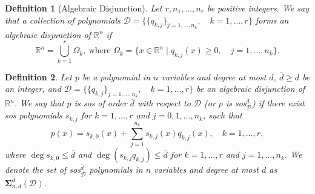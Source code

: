 \documentclass[12pt]{article}
\newcommand{\reals}{\mathbb{R}}
\newcommand{\DiSOS}{\mathbf{\Sigma}}
\newcommand{\mcD}{\mathcal{D}}
\newtheorem{definition}{Definition}%
\theoremstyle{remark}
\newtheorem{remark}{Remark}%
\begin{document}
\begin{definition}[Algebraic Disjunction]\label{def:disjunction}
Let $r,n_1,\ldots,n_r$ be positive integers. We say that a collection of polynomials $\mcD=\{\{q_{k,j}\}_{j=1,\ldots, n_k},\quad k=1,\ldots,r\}$ forms an \emph{algebraic disjunction} of $\reals^n$ if 
\[\mathbb{R}^n=\bigcup\limits_{k=1}^r\Omega_{k},\ \text{where }\Omega_k=\{x\in\mathbb{R}^n\mid q_{k,j}(x)\ge 0,\quad j=1,\ldots,n_k\}.\]
\end{definition}
\begin{definition}\label{def:disos}
Let $p$ be a polynomial in $n$ variables and degree at most $d$, $\bar{d}\ge d$ be an integer, and $\mcD=\{\{q_{k,j}\}_{j=1,\ldots, n_k},\quad k=1,\ldots,r\}$ be an algebraic disjunction of $\reals^n$.
We say that $p$ is \emph{sos of order $\bar{d}$ with respect to }$\mcD$ \emph{(or $p$ is sos$^{\bar{d}}_\mathcal{D}$)} if there exist sos polynomials $s_{k,j}$ for $k=1,\ldots, r$ and $j=0,1,\ldots,n_k$, such that 
\begin{equation}\label{def:sos_ad}
    p(x)=s_{k,0}(x)+\sum_{j=1}^{n_k} s_{k,j}(x)q_{k,j}(x),\quad  k=1,\ldots, r,
\end{equation}
where $\deg s_{k,0}\le \bar{d}$ and $\deg(s_{k,j}q_{k,j})\le \bar{d}$ for $k=1,\ldots,r$ and  $j=1,\ldots,n_k$. 
We denote the set of sos$^{\bar{d}}_\mcD$ polynomials in $n$ variables and degree at most $d$ as $\DiSOS_{n,d}^{\bar{d}}(\mcD)$.
\end{definition}
\end{document}
